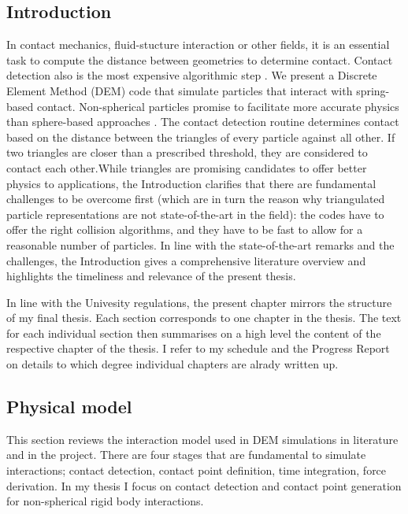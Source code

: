 \documentclass[times,12pt]{article}
\begin{document}
\subsection{Introduction}

In contact mechanics, fluid-stucture interaction or other fields, it is an essential task to compute the distance between geometries to determine contact. Contact detection also is the most expensive algorithmic step \cite{Koziara2010, Wachs2012}. We present a Discrete Element Method (DEM) code that simulate particles that interact with spring-based contact. Non-spherical particles promise to facilitate more accurate physics than sphere-based approaches \cite{AlonsoMarroqu2013, Girolami2012}. The contact detection routine determines contact based on the distance between the triangles of every particle against all other. If two triangles are closer than a prescribed threshold, they are considered to contact each other.While triangles are promising candidates to offer better physics to applications, the Introduction
clarifies that there are fundamental challenges to be overcome first
(which are in turn the reason why triangulated particle representations
are not state-of-the-art in the field): the codes have to offer the
right collision algorithms, and they have to be fast to allow for a
reasonable number of particles. In line with the state-of-the-art
remarks and the challenges, the Introduction gives a comprehensive
literature overview and highlights the timeliness and relevance of the
present thesis.

In line with the Univesity regulations, the present chapter mirrors
the structure of my final thesis. Each section corresponds to one
chapter in the thesis. The text for each individual section then
summarises on a high level the content of the respective chapter of the
thesis. I refer to my schedule and the Progress Report on details to
which degree individual chapters are alrady written up.

\subsection{Physical model}

This section reviews the interaction model used in DEM simulations in literature and in the project. There are four stages that are fundamental to simulate interactions; contact detection, contact point definition, time integration, force derivation. In my thesis I focus on contact detection and contact point generation for non-spherical rigid body interactions.  
\end{document}
